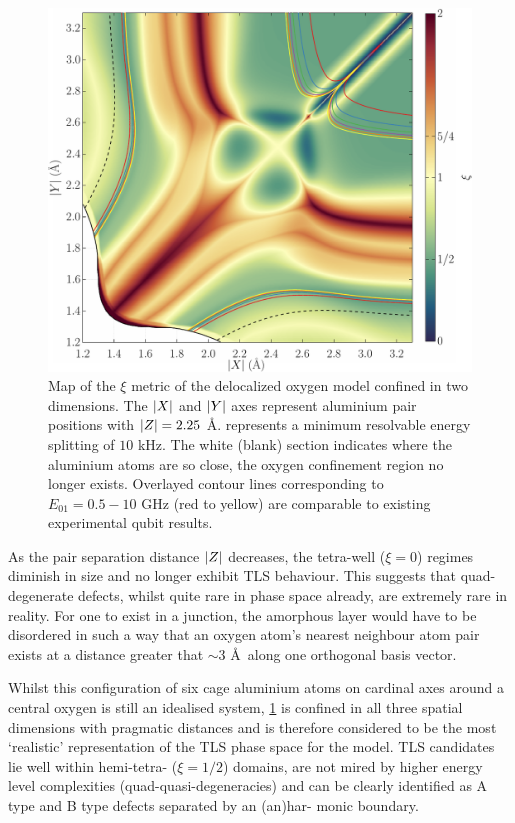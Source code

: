 \begin{figure}[htp]
  \includegraphics[width=\textwidth]{figures/xi225}
  \caption[$\xi$ Metric Phase Map, With $\abs{Z} = 2.25$ \AA]{\label{fig:xi225}Map of the $\xi$ metric of the delocalized oxygen model confined in two dimensions. The $\lvert X\rvert$ and $\lvert Y\rvert$ axes represent aluminium pair positions with $\abs{Z} = 2.25$ \AA.  represents a minimum resolvable energy splitting of $10$ kHz. The white (blank) section indicates where the aluminium atoms are so close, the oxygen confinement region no longer exists. Overlayed contour lines corresponding to $E_{01} = 0.5\!-\!10$ GHz (red to yellow) are comparable to existing experimental qubit results.}
\end{figure}

As the pair separation distance $\lvert Z\rvert$ decreases, the tetra-well ($\xi=0$) regimes diminish in size and no longer exhibit TLS behaviour.
This suggests that quad-degenerate defects, whilst quite rare in phase space already, are extremely rare in reality.
For one to exist in a junction, the amorphous layer would have to be disordered in such a way that an oxygen atom's nearest neighbour atom pair exists at a distance greater that $\sim 3$ \AA\ along one orthogonal basis vector.

Whilst this configuration of six cage aluminium atoms on cardinal axes around a central oxygen is still an idealised system, \cref{fig:xi225} is confined in all three spatial dimensions with pragmatic distances and is therefore considered to be the most `realistic' representation of the TLS phase space for the  model.
TLS candidates lie well within hemi-tetra- ($\xi=1/2$) domains, are not mired by higher energy level complexities (\ie quad-quasi-degeneracies) and can be clearly identified as A type and B type defects separated by an (an)har- monic boundary.

